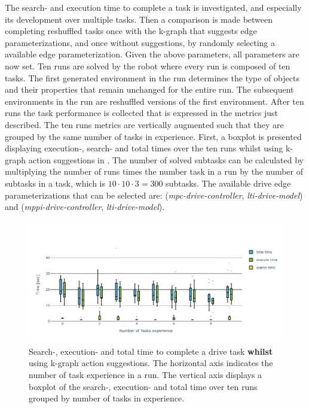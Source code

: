 The search- and execution time to complete a task is investigated, and especially its development over multiple tasks. Then a comparison is made between completing reshuffled tasks once with the \ac{k-graph} that suggests edge parameterizations, and once without suggestions, by randomly selecting a available edge parameterization. Given the above parameters, all parameters are now set. Ten runs are solved by the robot where every run is composed of ten tasks. The first generated environment in the run determines the type of objects and their properties that remain unchanged for the entire run. The subsequent environments in the run are reshuffled versions of the first environment. After ten runs the task performance is collected that is expressed in the metrics just described. The ten runs metrics are vertically augmented such that they are grouped by the same number of tasks in experience. First, a boxplot is presented displaying execution-, search- and total times over the ten runs whilst using \ac{k-graph} action suggestions in . The number of solved subtasks can be calculated by multiplying the number of runs times the number task in a run by the number of subtasks in a task, which is $10 \cdot 10 \cdot 3 = 300$ subtasks. The available drive edge parameterizations that can be selected are: (\textit{mpc-drive-controller}, \textit{lti-drive-model}) and (\textit{mppi-drive-controller}, \textit{lti-drive-model}).\bs

\begin{figure}[H]
    \centering
    \includegraphics[width=\textwidth]{figures/results/random_drive_time_k-graph}
    \caption{Search-, execution- and total time to complete a drive task \textbf{whilst} using \ac{k-graph} action suggestions. The horizontal axis indicates the number of task experience in a run. The vertical axis displays a boxplot of the search-, execution- and total time over ten runs grouped by number of tasks in experience.}%
   \label{fig:random_drive_time_k-graph}
\end{figure}

